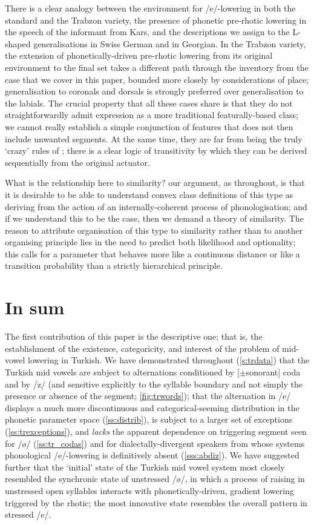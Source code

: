 There is a clear analogy between the environment for /e/-lowering in both the standard and the Trabzon variety, the presence of phonetic pre-rhotic lowering in the speech of the informant from Kars, and the descriptions we assign to the L-shaped generalisations in Swiss German and in Georgian. In the Trabzon variety, the extension of phonetically-driven pre-rhotic lowering from its original environment to the final set takes a different path through the inventory from the case that we cover in this paper, bounded more closely by considerations of place; generalisation to coronals and dorsals is strongly preferred over generalisation to the labials. The crucial property that all these cases share is that they do not straightforwardly admit expression as a more traditional featurally-based class; we cannot really establish a simple conjunction of features that does not then include unwanted segments. At the same time, they are far from being the truly `crazy' rules of \citet{Bach1972}; there is a clear logic of transitivity by which they can be derived sequentially from the original actuator.

What is the relationship here to similarity? our argument, as throughout, is that it is desirable to be able to understand convex class definitions of this type as deriving from the action of an internally-coherent process of phonologisation; and if we understand this to be the case, then we demand a theory of similarity. The reason to attribute organisation of this type to similarity rather than to another organising principle lies in the need to predict both likelihood and optionality; this calls for a parameter that behaves more like a continuous distance or like a transition probability than a strictly hierarchical principle.

\section{In sum}

The first contribution of this paper is the descriptive one; that is, the establishment of the existence, categoricity, and interest of the problem of mid-vowel lowering in Turkish. We have demonstrated throughout (\cref{s:trdata}) that the Turkish mid vowels are subject to alternations conditioned by [$\pm$sonorant] coda and by /z/ (and sensitive explicitly to the syllable boundary and not simply the presence or absence of the segment; \cref{fig:trwords}); that the alternation in /e/ displays a much more discontinuous and categorical-seeming distribution in the phonetic parameter space (\cref{ss:distrib}), is subject to a larger set of exceptions (\cref{ss:trexceptions}), and \emph{lacks} the apparent dependence on triggering segment seen for /\o/ (\cref{ss:tr_codas}) and for dialectally-divergent speakers from whose systems phonological /e/-lowering is definitively absent (\cref{sss:abdiz}). We have suggested further that the `initial' state of the Turkish mid vowel system most closely resembled the synchronic state of unstressed /\o/, in which a process of raising in unstressed open syllables interacts with phonetically-driven, gradient lowering triggered by the rhotic; the most innovative state resembles the overall pattern in stressed /e/.


